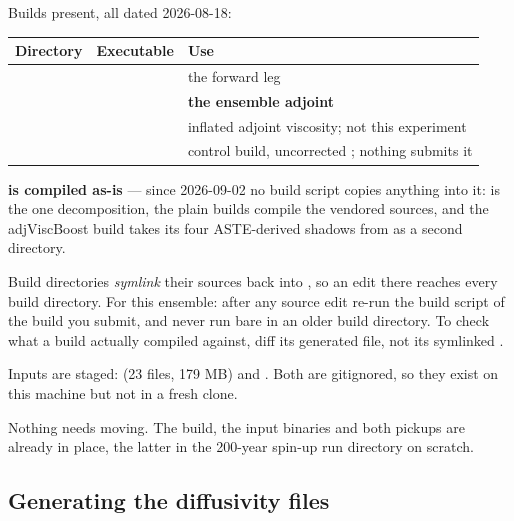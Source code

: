Builds present, all dated 2026-08-18:

\begin{center}
\begin{tabularx}{\textwidth}{@{}Y{1.05}Y{0.75}Y{1.2}@{}}
\toprule
\textbf{Directory} & \textbf{Executable} & \textbf{Use}\\
\midrule
{} &  & the forward leg\\
 & 
  & \textbf{the ensemble adjoint}\\
 & 
  & inflated adjoint viscosity; not this experiment\\
 & 
  & control build, uncorrected ; nothing submits it\\
\bottomrule
\end{tabularx}
\end{center}

\begin{callout}
\textbf{ is compiled as-is} --- since 2026-09-02 no build
script copies anything into it:  is the one decomposition, the
plain builds compile the vendored  sources, and the
adjViscBoost build takes its four ASTE-derived shadows from
 as a second  directory.

Build directories \emph{symlink} their sources back into , so
an edit there reaches every build directory. For this ensemble: after any
source edit re-run the build script of the build you submit, and never run
bare  in an older build directory. To check what a build actually
compiled against, diff its generated  file, not its symlinked
.
\end{callout}

Inputs are staged:  (23 files, 179 MB) and
. Both are gitignored, so they exist on
this machine but not in a fresh clone.

Nothing needs moving. The build, the input binaries and both pickups are already
in place, the latter in the 200-year spin-up run directory on scratch.

\subsection{Generating the diffusivity files}

